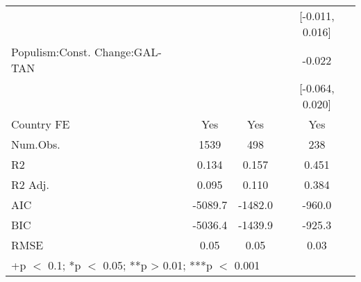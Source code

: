 \begin{table}
\begin{tabular}[t]{lccc}
 &  &  & {}[-0.011, 0.016]\\
Populism:Const. Change:GAL-TAN &  &  & -0.022\\
 &  &  & {}[-0.064, 0.020]\\
\midrule
Country FE & Yes & Yes & Yes\\
Num.Obs. & 1539 & 498 & 238\\
R2 & 0.134 & 0.157 & 0.451\\
R2 Adj. & 0.095 & 0.110 & 0.384\\
AIC & -5089.7 & -1482.0 & -960.0\\
BIC & -5036.4 & -1439.9 & -925.3\\
RMSE & 0.05 & 0.05 & 0.03\\
\bottomrule
\multicolumn{4}{l}{\rule{0pt}{1em}+p $<$ 0.1; *p $<$ 0.05; **p > 0.01; ***p $<$ 0.001}\\
\end{tabular}
\end{table}
